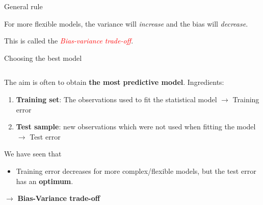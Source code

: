 \documentclass[ignorenonframetext,]{beamer}
\providecommand{\tightlist}{%
  \setlength{\itemsep}{0pt}\setlength{\parskip}{0pt}}
\begin{document}
\begin{frame}

\begin{block}{General rule}

\vspace{4mm}

For more flexible models, the variance will \emph{increase} and the bias
will \emph{decrease}.

\vspace{4mm}

\centering

This is called the \emph{\textcolor{red}{Bias-variance trade-off}}.

\end{block}

\end{frame}

\begin{frame}

\begin{block}{Choosing the best model}

\(~\)

The aim is often to obtain \textbf{the most predictive model}.
Ingredients:

\vspace{2mm}

\begin{enumerate}
\tightlist
\item
  \textbf{Training set}: The observations used to fit the statistical
  model \(\rightarrow\) Training error
\end{enumerate}

\vspace{2mm}

\begin{enumerate}
\setcounter{enumi}{1}
\tightlist
\item
  \textbf{Test sample}: new observations which were not used when
  fitting the model \(\rightarrow\) Test error
\end{enumerate}

\vspace{4mm}

We have seen that

\vspace{4mm}

\begin{itemize}
\tightlist
\item
  Training error decreases for more complex/flexible models, but the
  test error has an \textbf{optimum}.
\end{itemize}

\centering

\(\rightarrow\) \textbf{Bias-Variance trade-off}

\end{block}

\end{frame}
\end{document}
